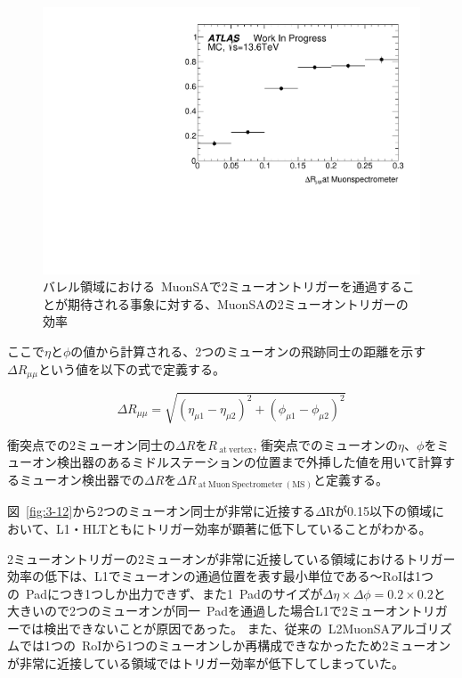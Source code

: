 \begin{figure}[H]
    \centering
    \includegraphics[clip, width=13cm]{fig/3/2mu14_MC.pdf}
    \caption{バレル領域における~MuonSAで2ミューオントリガーを通過することが期待される事象に対する、MuonSAの2ミューオントリガーの効率}
    \label{fig:3-13}
\end{figure}

ここで$\eta$と$\phi$の値から計算される、2つのミューオンの飛跡同士の距離を示す$\Delta R_{\mu\mu}$という値を以下の式で定義する。

\begin{equation}
    \Delta R_{\mu \mu}=\sqrt{\left(\eta_{\mu 1}-\eta_{\mu 2}\right)^2+\left(\phi_{\mu 1}-\phi_{\mu 2}\right)^2}
\end{equation}

衝突点での2ミューオン同士の$\Delta R$を$R_{\mathrm{~at~vertex}}$, 衝突点でのミューオンの$\eta$、$\phi$をミューオン検出器のあるミドルステーションの位置まで外挿した値を用いて計算するミューオン検出器での$\Delta R$を$\Delta R_{\mathrm{~at~Muon~Spectrometer~(MS)}}$と定義する。

図~\ref{fig:3-12}から2つのミューオン同士が非常に近接する$\Delta \mathrm{R}$が0.15以下の領域において、L1・HLTともにトリガー効率が顕著に低下していることがわかる。

2ミューオントリガーの2ミューオンが非常に近接している領域におけるトリガー効率の低下は、L1でミューオンの通過位置を表す最小単位である～RoIは1つの~Padにつき1つしか出力できず、また1~Padのサイズが$\Delta\eta\times\Delta\phi=0.2\times0.2$と大きいので2つのミューオンが同一~Padを通過した場合L1で2ミューオントリガーでは検出できないことが原因であった。
また、従来の~L2MuonSAアルゴリズムでは1つの~RoIから1つのミューオンしか再構成できなかったため2ミューオンが非常に近接している領域ではトリガー効率が低下してしまっていた。

